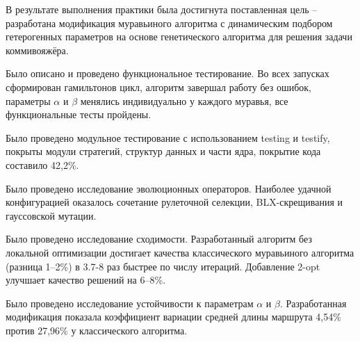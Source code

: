 
В результате выполнения практики была достигнута поставленная цель -- разработана модификация муравьиного алгоритма с динамическим подбором гетерогенных параметров на основе генетического алгоритма для решения задачи коммивояжёра.

Было описано и проведено функциональное тестирование. Во всех запусках сформирован гамильтонов цикл, алгоритм завершал работу без ошибок, параметры $\alpha$ и $\beta$ менялись индивидуально у каждого муравья, все функциональные тесты пройдены.

Было проведено модульное тестирование с использованием testing и testify, покрыты модули стратегий, структур данных и части ядра, покрытие кода составило 42,2\%.

Было проведено исследование эволюционных операторов. Наиболее удачной конфигурацией оказалось сочетание рулеточной селекции, BLX-скрещивания и гауссовской мутации.

Было проведено исследование сходимости. Разработанный алгоритм без локальной оптимизации достигает качества классического муравьиного алгоритма (разница 1–2\%) в 3.7-8 раз быстрее по числу итераций. Добавление 2-opt улучшает качество решений на 6–8\%.

Было проведено исследование устойчивости к параметрам $\alpha$ и $\beta$. Разработанная модификация показала коэффициент вариации средней длины маршрута 4,54\% против 27,96\% у классического алгоритма.